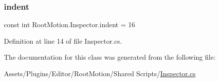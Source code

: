 \subsubsection{\texorpdfstring{indent}{indent}}
{\footnotesize\ttfamily const int Root\+Motion.\+Inspector.\+indent = 16}



Definition at line 14 of file Inspector.\+cs.



The documentation for this class was generated from the following file\+:\begin{DoxyCompactItemize}
\item 
Assets/\+Plugins/\+Editor/\+Root\+Motion/\+Shared Scripts/\mbox{\hyperlink{_inspector_8cs}{Inspector.\+cs}}\end{DoxyCompactItemize}

